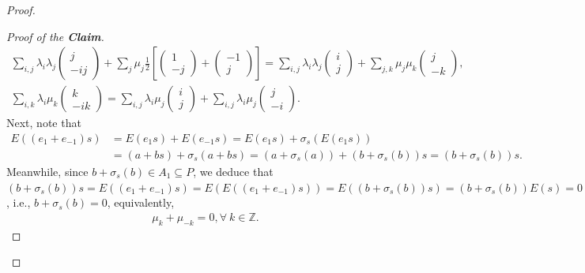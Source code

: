 \documentclass[12pt]{amsart}
\theoremstyle{definition}
\theoremstyle{remark}
\begin{document}
\begin{proof}
\begin{proof}[Proof of the \textbf{Claim}]
\begin{align}
\label{eq-a: n=1 case}\sum_{i,j}\lambda_i\lambda_j\begin{pmatrix}
j\\
-ij
\end{pmatrix}+\sum_j\mu_j\frac{1}{2}[\begin{pmatrix}
1\\
-j
\end{pmatrix}+\begin{pmatrix}
-1\\
j
\end{pmatrix}]=\sum_{i, j}\lambda_i\lambda_j\begin{pmatrix}
i\\
j
\end{pmatrix}+\sum_{j, k}\mu_j\mu_k\begin{pmatrix}
j\\
-k
\end{pmatrix},\\
\label{eq-b: n=1 case}\sum_{i, k}\lambda_i\mu_k\begin{pmatrix}
k\\
-ik
\end{pmatrix}=\sum_{i,j}\lambda_i\mu_j\begin{pmatrix}
i\\
j
\end{pmatrix}+\sum_{i, j}\lambda_i\mu_j\begin{pmatrix}
j\\
-i
\end{pmatrix}.
\end{align}
Next, note that
\begin{align*}
E((e_1+e_{-1})s)&=E(e_1s)+E(e_{-1}s)=E(e_1s)+\sigma_s(E(e_1s))\\
&=(a+bs)+\sigma_s(a+bs)
=(a+\sigma_s(a))+(b+\sigma_s(b))s=(b+\sigma_s(b))s.
\end{align*}
Meanwhile, since $b+\sigma_s(b)\in A_1\subseteq P$, we deduce that $(b+\sigma_s(b))s=E((e_1+e_{-1})s)=E(E((e_1+e_{-1})s))=E((b+\sigma_s(b))s)=(b+\sigma_s(b))E(s)=0$, i.e., $b+\sigma_s(b)=0$, equivalently, 
\begin{align}\label{eq: skew-symmetry on coefficients of b, case n=1}
\mu_k+\mu_{-k}=0, \forall ~k\in \mathbb{Z}.
\end{align}


\end{proof}
\end{proof}
\end{document}
